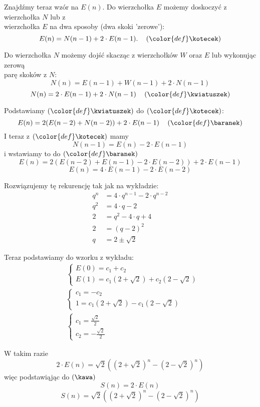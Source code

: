 \documentclass{article}
\begin{document}
Znajdźmy teraz wzór na $E(n)$. Do wierzchołka $E$ możemy doskoczyć z wierzchołka $N$ lub z \\wierzchołka $E$ na dwa sposoby (dwa skoki 'zerowe'):
$$E(n)=N(n-1)+2\cdot E(n-1).\quad\left({\color{def}\kotecek}\right)$$

Do wierzchołka $N$ możemy dojść skacząc z wierzchołków $W$ oraz $E$ lub wykonując zerową \\parę skoków z $N$:
$$N(n)=E(n-1)+W(n-1)+2\cdot N(n-1)$$
$$N(n)=2\cdot E(n-1)+2\cdot N(n-1)\quad \left({\color{def}\kwiatuszek}\right)$$

Podstawiamy $\left({\color{def}\kwiatuszek}\right)$ do $\left({\color{def}\kotecek}\right)$:
$$E(n)=2(E(n-2)+N(n-2))+2\cdot E(n-1)\quad \left({\color{def}\baranek}\right)$$
I teraz z $\left({\color{def}\kotecek}\right)$ mamy
$$N(n-1)=E(n)-2\cdot E(n-1)$$
i wstawiamy to do $\left({\color{def}\baranek}\right)$
$$E(n)=2(E(n-2)+E(n-1)-2\cdot E(n-2))+2\cdot E(n-1)$$
$$E(n)=4\cdot E(n-1)-2\cdot E(n-2)$$

Rozwiązujemy tę rekurencję tak jak na wykładzie:
\begin{align*}
    q^n&=4\cdot q^{n-1}-2\cdot q^{n-2}\\
    q^2&=4\cdot q-2\\
    2&=q^2-4\cdot q+4\\
    2&=(q-2)^2\\
    q&=2\pm\sqrt{2}
\end{align*}

Teraz podstawiamy do wzorku z wykładu:
\begin{align*}
    &\begin{cases}
        E(0)=c_1+c_2\\
        E(1)=c_1(2+\sqrt{2})+c_2(2-\sqrt{2})
    \end{cases}\\
    &\begin{cases}
        c_1=-c_2\\
        1=c_1(2+\sqrt{2})-c_1(2-\sqrt{2})
    \end{cases}\\
    &\begin{cases}
        c_1=\frac{\sqrt{2}}2\\
        c_2=-\frac{\sqrt{2}}2
    \end{cases}
\end{align*}

W takim razie
$$2\cdot E(n)={\sqrt2}((2+\sqrt2)^n-(2-\sqrt2)^n)$$
więc podstawiąjąc do $\left(\kawa\right)$
$$S(n)=2\cdot E(n)$$
$$S(n)={\sqrt2}((2+\sqrt2)^n-(2-\sqrt2)^n)$$
\kondow
\end{document}
